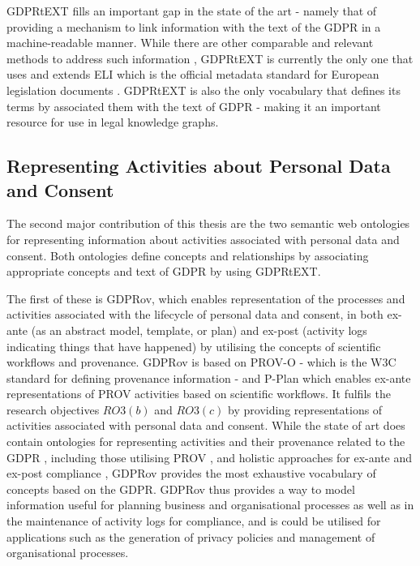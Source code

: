 GDPRtEXT fills an important gap in the state of the art - namely that of providing a mechanism to link information with the text of the GDPR in a machine-readable manner. While there are other comparable and relevant methods to address such information \cite{agarwal_legislative_2018,palmirani_pronto:_2018-1}, GDPRtEXT is currently the only one that uses and extends ELI which is the official metadata standard for European legislation documents \cite{noauthor_council_2012}. GDPRtEXT is also the only vocabulary that defines its terms by associated them with the text of GDPR - making it an important resource for use in legal knowledge graphs.

\subsection{Representing Activities about Personal Data and Consent}
The second major contribution of this thesis are the two semantic web ontologies for representing information about activities associated with personal data and consent. Both ontologies define concepts and relationships by associating appropriate concepts and text of GDPR by using GDPRtEXT.

The first of these is GDPRov, which enables representation of the processes and activities associated with the lifecycle of personal data and consent, in both ex-ante (as an abstract model, template, or plan) and ex-post (activity logs indicating things that have happened) by utilising the concepts of scientific workflows and provenance.
GDPRov is based on PROV-O \cite{lebo_prov-o:_2013} - which is the W3C standard for defining provenance information - and P-Plan \cite{garijo_p-plan_2014} which enables ex-ante representations of PROV activities based on scientific workflows. It fulfils the research objectives $RO3(b)$ and $RO3(c)$ by providing representations of activities associated with personal data and consent.
While the state of art does contain ontologies for representing activities and their provenance related to the GDPR \cite{pasquier_data_2018,palmirani_pronto:_2018-1}, including those utilising PROV \cite{belhajjame_provenance_2018,bonatti_special_2018-1}, and holistic approaches for ex-ante and ex-post compliance \cite{dullaert_d3.4_2019}, GDPRov provides the most exhaustive vocabulary of concepts based on the GDPR.
GDPRov thus provides a way to model information useful for planning business and organisational processes as well as in the maintenance of activity logs for compliance, and is could be utilised for applications such as the generation of privacy policies and management of organisational processes.

